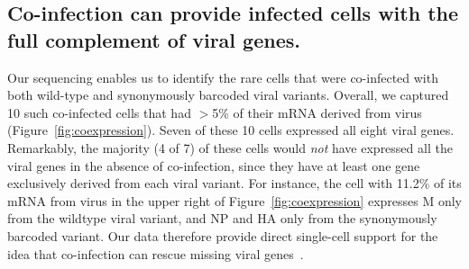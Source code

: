 \documentclass[9pt,lineno]{elife}
\begin{document}
\subsection{Co-infection can provide infected cells with the full complement of viral genes.}
Our sequencing enables us to identify the rare cells that were co-infected with both wild-type and synonymously barcoded viral variants.
Overall, we captured 10 such co-infected cells that had $>$5\% of their mRNA derived from virus (Figure~\ref{fig:coexpression}).
Seven of these 10 cells expressed all eight viral genes.
Remarkably, the majority (4 of 7) of these cells would \emph{not} have expressed all the viral genes in the absence of co-infection, since they have at least one gene exclusively derived from each viral variant.
For instance, the cell with 11.2\% of its mRNA from virus in the upper right of Figure~\ref{fig:coexpression} expresses M only from the wildtype viral variant, and NP and HA only from the synonymously barcoded variant.
Our data therefore provide direct single-cell support for the idea that co-infection can rescue missing viral genes~\citep{Brooke:2013kb,Fonville:2015cg,aguilera2017plaques}.
\end{document}
